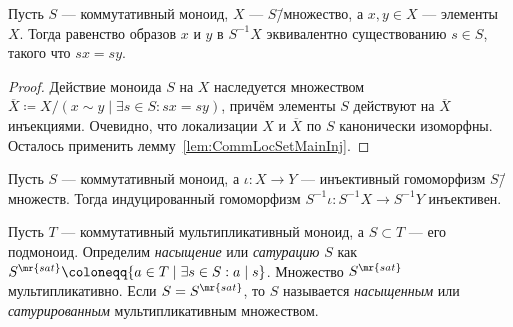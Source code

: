\documentclass[
	extrafontsizes,
	11pt,
	hyphens,
]{memoir}
\begin{document}
\begin{theorem}
Пусть \(S\) --- коммутативный моноид, \(X\) --- \(S\)\=/множество,
а \(x, y \in X\) --- элементы \(X\).%
\label{thm:CommLocSetMain}
Тогда равенство образов \(x\) и \(y\) в \(S^{-1}X\) эквивалентно существованию \(s \in S\), такого что \(sx = sy\).
\end{theorem}

\begin{proof}
Действие моноида \(S\) на \(X\) наследуется множеством \(\overline{X} \coloneqq X / (x \sim y \mid \exists s \in S : sx = sy)\), причём элементы \(S\) действуют на \(\overline{X}\) инъекциями.
Очевидно, что
локализации \(X\) и \(\overline{X}\) по \(S\) канонически изоморфны.
Осталось применить лемму~\ref{lem:CommLocSetMainInj}.
\end{proof}

\begin{observation}
Пусть \(S\) --- коммутативный моноид, а \(\iota: X \to Y\) --- инъективный гомоморфизм \(S\)\=/множеств.%
\label{InjHomLocSets}
Тогда индуцированный гомоморфизм \(S^{-1}\iota : S^{-1}X \to S^{-1}Y\) инъективен.
\end{observation}



\begin{definition}
Пусть \(T\) --- коммутативный мультипликативный моноид, а \(S \subset T\) --- его подмоноид. Определим \emph{насыщение} или \emph{сатурацию} \(S\) как
\(
S^\mr{sat} \coloneqq
\{a \in T \mid \exists s \in S : a \mid s\}
\).
Множество \(S^\mr{sat}\) мультипликативно. Если \(S = S^\mr{sat}\), то \(S\) называется \emph{насыщенным} или \emph{сатурированным} мультипликативным множеством.
\end{definition}
\end{document}
